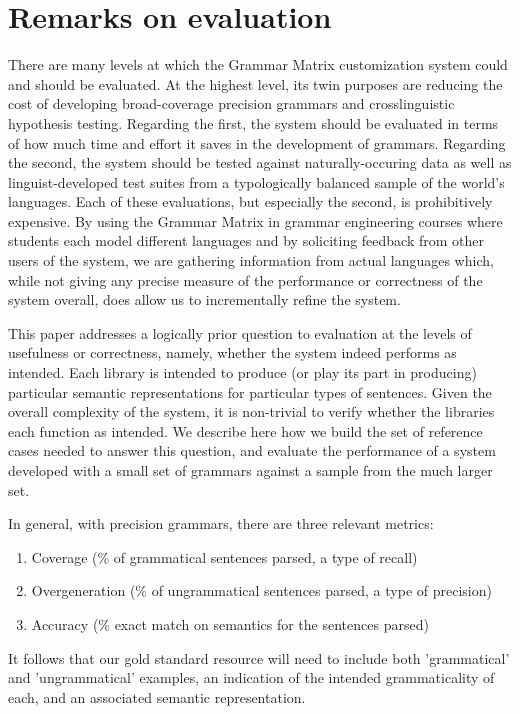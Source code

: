 \documentclass[11pt]{article}
\begin{document}

\section{Remarks on evaluation}

There are many levels at which the Grammar Matrix customization system
could and should be evaluated. At the highest level, its twin purposes
are reducing the cost of developing broad-coverage precision grammars
and crosslinguistic hypothesis testing.  Regarding the first, the
system should be evaluated in terms of how much time and effort it
saves in the development of grammars.  Regarding the second, the
system should be tested against naturally-occuring data as well as
linguist-developed test suites from a typologically balanced sample of
the world's languages.  Each of these evaluations, but especially the
second, is prohibitively expensive.  By using the Grammar Matrix in
grammar engineering courses where students each model different
languages and by soliciting feedback from other users of the system,
we are gathering information from actual languages which, while not
giving any precise measure of the performance or correctness of the
system overall, does allow us to incrementally refine the system.

This paper addresses a logically prior question to evaluation at
the levels of usefulness or correctness, namely, whether the system
indeed performs as intended. Each library is intended to produce
(or play its part in producing) particular semantic representations for
particular types of sentences.  Given the overall complexity of the
system, it is non-trivial to verify whether the libraries each function
as intended.  We describe here how we build the set of reference cases
needed to answer this question, and evaluate the performance of
a system developed with a small set of grammars against a sample
from the much larger set.

In general, with precision grammars, there are three relevant
metrics:

\begin{enumerate}
\item Coverage (\% of grammatical sentences parsed, a type of recall)
\item Overgeneration (\% of ungrammatical sentences parsed, a type of precision)
\item Accuracy (\% exact match on semantics for the sentences parsed)
\end{enumerate}
%
It follows that our gold standard resource will need to include
both 'grammatical' and 'ungrammatical' examples, an indication of the
intended grammaticality of each, and an associated semantic representation.
\end{document}
